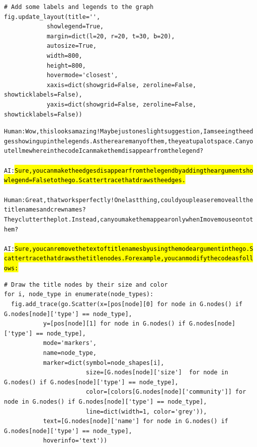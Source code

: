 \begin{tcolorbox}
\begin{verbatim}
# Add some labels and legends to the graph
fig.update_layout(title='',
            showlegend=True,
            margin=dict(l=20, r=20, t=30, b=20),
            autosize=True,
            width=800,
            height=800,
            hovermode='closest',
            xaxis=dict(showgrid=False, zeroline=False, showticklabels=False),
            yaxis=dict(showgrid=False, zeroline=False, showticklabels=False))
\end{verbatim}
\parbox[t]{1\linewidth}{\tiny\begin{alltt}
Human: Wow, this looks amazing! Maybe just one slight suggestion, I am seeing the edges showing up in the legends. As there are many of them, they eat up a lot space. Can you tell me where in the code I can make them disappear from the legend?
\\
\\
AI:\hl{ Sure, you can make the edges disappear from the legend by adding the argument showlegend=False to the go.Scatter trace that draws the edges.}
\\
\\
Human: Great, that works perfectly! One last thing, could you please remove all the title names and crew names? They clutter the plot. Instead, can you make them appear only when I move mouse onto them?
\\
\\
AI:\hl{ Sure, you can remove the text of title names by using the mode argument in the go.Scatter trace that draws the title nodes. For example, you can modify the code as follows:}
\end{alltt}}
\vspace{-.5cm}
\begin{verbatim}
# Draw the title nodes by their size and color
for i, node_type in enumerate(node_types):
  fig.add_trace(go.Scatter(x=[pos[node][0] for node in G.nodes() if G.nodes[node]['type'] == node_type],
           y=[pos[node][1] for node in G.nodes() if G.nodes[node]['type'] == node_type],
           mode='markers',
           name=node_type,
           marker=dict(symbol=node_shapes[i],
                       size=[G.nodes[node]['size']  for node in G.nodes() if G.nodes[node]['type'] == node_type],
                       color=[colors[G.nodes[node]['community']] for node in G.nodes() if G.nodes[node]['type'] == node_type],
                       line=dict(width=1, color='grey')),
           text=[G.nodes[node]['name'] for node in G.nodes() if G.nodes[node]['type'] == node_type],
           hoverinfo='text'))
\end{verbatim}

\end{tcolorbox}

